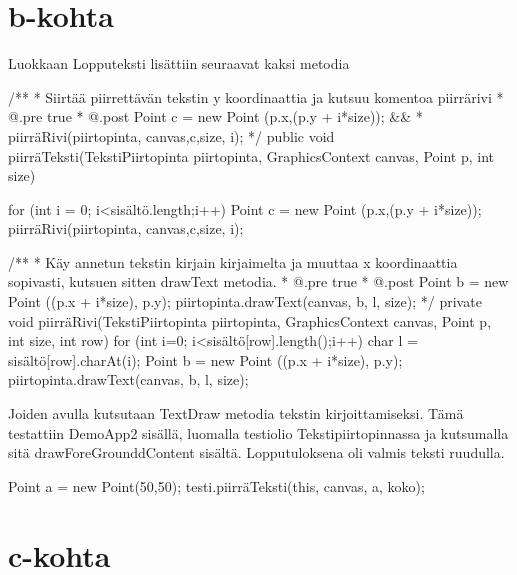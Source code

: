 \section{b-kohta}
\label{b-kohta}
 
Luokkaan Lopputeksti lisättiin seuraavat kaksi metodia
\begin{javacode}
/**
     * Siirtää piirrettävän tekstin y koordinaattia ja kutsuu komentoa piirrärivi
     * @.pre true
     * @.post Point c = new Point (p.x,(p.y + i*size)); &&
     *        piirräRivi(piirtopinta, canvas,c,size, i);
     */
    public void piirräTeksti(TekstiPiirtopinta piirtopinta, GraphicsContext canvas, Point p, int size) {
      for (int i = 0; i<sisältö.length;i++) {
        Point c = new Point (p.x,(p.y + i*size));
        piirräRivi(piirtopinta, canvas,c,size, i);
      }
      
    }
    /**
     * Käy annetun tekstin kirjain kirjaimelta ja muuttaa x koordinaattia sopivasti,
       kutsuen sitten drawText metodia.
     * @.pre true
     * @.post Point b = new Point ((p.x + i*size), p.y);
          piirtopinta.drawText(canvas, b, l, size);
     */
    private void piirräRivi(TekstiPiirtopinta piirtopinta, GraphicsContext canvas, Point p, int size, int row) {
      for (int i=0; i<sisältö[row].length();i++) {
        char l = sisältö[row].charAt(i);
        Point b = new Point ((p.x + i*size), p.y);
        piirtopinta.drawText(canvas, b, l, size);
      }
    }
\end{javacode}
Joiden avulla kutsutaan TextDraw metodia tekstin kirjoittamiseksi. Tämä testattiin DemoApp2 sisällä, luomalla
testiolio Tekstipiirtopinnassa ja kutsumalla sitä drawForeGrounddContent sisältä. Lopputuloksena oli valmis
teksti ruudulla.
\begin{javacode}
Point a = new Point(50,50);
testi.piirräTeksti(this, canvas, a, koko);
\end{javacode}

\section{c-kohta}
\label{c-kohta}

